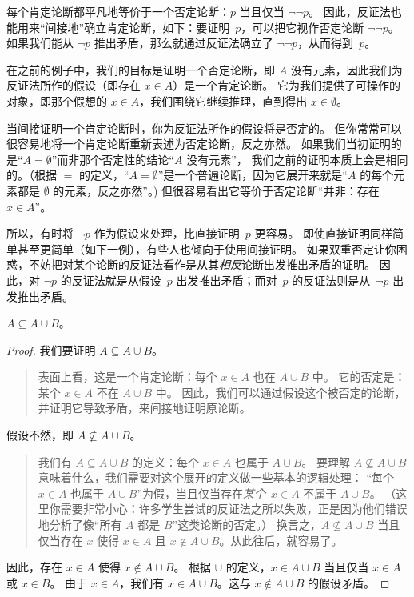 \documentclass[../../../include/open-logic-section]{subfiles}
\begin{document}
每个肯定论断都平凡地等价于一个否定论断：$p$ 当且仅当 $\lnot\lnot p$。
因此，反证法也能用来“间接地”确立肯定论断，如下：要证明~$p$，可以把它视作否定论断 $\lnot\lnot p$。
如果我们能从 $\lnot p$ 推出矛盾，那么就通过反证法确立了 $\lnot\lnot p$，从而得到~$p$。

在之前的例子中，我们的目标是证明一个否定论断，即 $A$ 没有元素，因此我们为反证法所作的假设（即存在 $x \in A$）是一个肯定论断。
它为我们提供了可操作的对象，即那个假想的 $x \in A$，我们围绕它继续推理，直到得出 $x \in \emptyset$。

当间接证明一个肯定论断时，你为反证法所作的假设将是否定的。
但你常常可以很容易地将一个肯定论断重新表述为否定论断，反之亦然。
如果我们当初证明的是“$A = \emptyset$”而非那个否定性的结论“$A$ 没有元素”，
我们之前的证明本质上会是相同的。（根据 $=$ 的定义，“$A = \emptyset$”是一个普遍论断，因为它展开来就是“$A$ 的每个元素都是 $\emptyset$ 的元素，反之亦然”。)
但很容易看出它等价于否定论断“并非：存在 $x \in A$”。

所以，有时将 $\lnot p$ 作为假设来处理，比直接证明~$p$ 更容易。
即使直接证明同样简单甚至更简单（如下一例），有些人也倾向于使用间接证明。
如果双重否定让你困惑，不妨把对某个论断的反证法看作是从其\emph{相反}论断出发推出矛盾的证明。
因此，对 $\lnot p$ 的反证法就是从假设~$p$ 出发推出矛盾；而对~$p$ 的反证法则是从~$\lnot p$ 出发推出矛盾。

\begin{prop}
$A \subseteq A \cup B$。
\end{prop}

\begin{proof}
  我们要证明 $A \subseteq A \cup B$。
  \begin{quote}
    表面上看，这是一个肯定论断：每个 $x \in A$ 也在 $A \cup B$ 中。
    它的否定是：某个 $x \in A$ 不在 $A \cup B$ 中。
    因此，我们可以通过假设这个被否定的论断，并证明它导致矛盾，来间接地证明原论断。
  \end{quote}
  假设不然，即 $A \nsubseteq A \cup B$。
  \begin{quote}
    我们有 $A \subseteq A \cup B$ 的定义：每个 $x \in A$ 也属于 $A \cup B$。
    要理解 $A \nsubseteq A \cup B$ 意味着什么，我们需要对这个展开的定义做一些基本的逻辑处理：
    “每个 $x \in A$ 也属于 $A \cup B$”为假，当且仅当存在\emph{某个}~$x \in A$ 不属于 $A \cup B$。
    （这里你需要非常小心：许多学生尝试的反证法之所以失败，正是因为他们错误地分析了像“所有 $A$ 都是 $B$”这类论断的否定。）
    换言之，$A \nsubseteq A \cup B$ 当且仅当存在 $x$ 使得 $x \in A$ 且 $x \notin A \cup B$。从此往后，就容易了。
  \end{quote}
  因此，存在 $x \in A$ 使得 $x \notin A \cup B$。
  根据 $\cup$ 的定义，$x \in A \cup B$ 当且仅当 $x \in A$ 或 $x \in B$。
  由于 $x \in A$，我们有 $x \in A \cup B$。这与 $x \notin A \cup B$ 的假设矛盾。
\end{proof}
\end{document}

